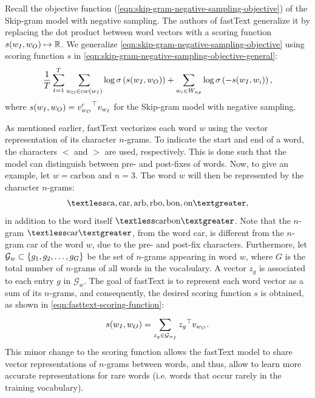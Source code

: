 Recall the objective function (\cref{eqn:skip-gram-negative-sampling-objective}) of the Skip-gram model with negative sampling. The authors of fastText generalize it by replacing the dot product between word vectors with a scoring function $s(w_I, w_O) \mapsto \mathbb{R}$. We generalize \cref{eqn:skip-gram-negative-sampling-objective} using scoring function $s$ in \cref{eqn:skip-gram-negative-sampling-objective-general}:
\begin{align}
    \frac{1}{T} \sum\limits_{t=1}^{T} \sum\limits_{w_O \in cw(w_I)}^{} \log \sigma \left( s(w_I, w_O) \right) + \sum\limits_{w_i \in W_{np}}^{} \log \sigma \left( -s(w_I, w_i) \right),
    \label{eqn:skip-gram-negative-sampling-objective-general}
\end{align}
where $s(w_I, w_O)={v'_{w_O}}^\top v_{w_I}$ for the Skip-gram model with negative sampling.

As mentioned earlier, fastText vectorizes each word $w$ using the vector representation of its character $n$-grams. To indicate the start and end of a word, the characters $<$ and $>$ are used, respectively. This is done such that the model can distinguish between pre- and post-fixes of words. Now, to give an example, let $w=\text{carbon}$ and $n=3$. The word $w$ will then be represented by the character $n$-grams:
\begin{align*}
    \textless\text{ca}, \text{car}, \text{arb}, \text{rbo}, \text{bon}, \text{on}\textgreater,
\end{align*}
in addition to the word itself $\textless\text{carbon}\textgreater$. Note that the $n$-gram $\textless\text{car}\textgreater$, from the word car, is different from the $n$-gram car of the word $w$, due to the pre- and post-fix characters. Furthermore, let $\mathcal{G}_w \subset \left\{g_1, g_2, \ldots, g_G\right\}$ be the set of $n$-grams appearing in word $w$, where $G$ is the total number of $n$-grams of all words in the vocabulary. A vector $z_g$ is associated to each entry $g$ in $\mathcal{G}_w$. The goal of fastText is to represent each word vector as a sum of its $n$-grams, and consequently, the desired scoring function $s$ is obtained, as shown in \cref{eqn:fasttext-scoring-function}:
\begin{align}
    s(w_I, w_O) = \sum\limits_{z_g \in \mathcal{G}_{w_I}}^{} {z_g}^\top v_{w_O}.
    \label{eqn:fasttext-scoring-function}
\end{align}
This minor change to the scoring function allows the fastText model to share vector representations of $n$-grams between words, and thus, allow to learn more accurate representations for rare words (i.e. words that occur rarely in the training vocabulary).

